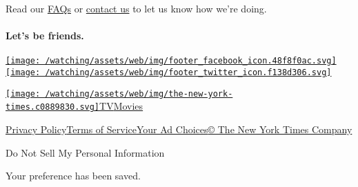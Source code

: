 Read our
\href{//www.nytimes3xbfgragh.onion/2017/01/10/watching/faq.html}{FAQs}
or \href{mailto:watchingcare@NYTimes.com}{contact us} to let us know how
we're doing.

\hypertarget{lets-be-friends}{%
\paragraph{Let's be friends.}\label{lets-be-friends}}

\href{https://www.facebookcorewwwi.onion/nytwatching/}{\texttt{[image: /watching/assets/web/img/footer\_facebook\_icon.48f8f0ac.svg]}}\href{https://twitter.com/watching}{\texttt{[image: /watching/assets/web/img/footer\_twitter\_icon.f138d306.svg]}}

\href{//www.nytimes3xbfgragh.onion}{\texttt{[image: /watching/assets/web/img/the-new-york-times.c0889830.svg]}}\href{//www.nytimes3xbfgragh.onion/section/arts/television}{TV}\href{//www.nytimes3xbfgragh.onion/section/movies}{Movies}

\href{//www.nytimes3xbfgragh.onion/content/help/rights/privacy/policy/privacy-policy.html}{Privacy
Policy}\href{//www.nytimes3xbfgragh.onion/content/help/rights/terms/terms-of-service.html}{Terms
of
Service}\href{//www.nytimes3xbfgragh.onion/content/help/rights/privacy/policy/privacy-policy.html\#pp}{Your
Ad Choices}\href{http://www.nytco.com/}{© The New York Times Company}

Do Not Sell My Personal Information

Your preference has been saved.
